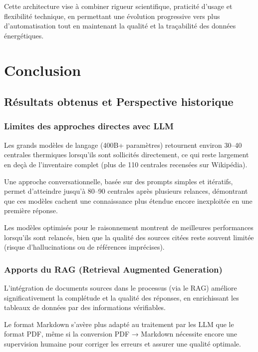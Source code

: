 \documentclass[a4paper,11pt]{report}
\begin{document}
Cette architecture vise à combiner rigueur scientifique, praticité d'usage et flexibilité technique, en permettant une évolution progressive vers plus d'automatisation tout en maintenant la qualité et la traçabilité des données énergétiques.

\chapter{Conclusion}\label{conclusion}

\section{Résultats obtenus et Perspective historique}\label{ruxe9sultats-obtenus-et-perspective-historique}

\subsection{Limites des approches directes avec LLM}\label{limites-des-approches-directes-avec-llm}

Les grands modèles de langage (400B+ paramètres) retournent environ 30--40 centrales thermiques lorsqu'ils sont sollicités directement, ce qui reste largement en deçà de l'inventaire complet (plus de 110 centrales recensées sur Wikipédia).

Une approche conversationnelle, basée sur des prompts simples et itératifs, permet d'atteindre jusqu'à 80--90 centrales après plusieurs relances, démontrant que ces modèles cachent une connaissance plus étendue encore inexploitée en une première réponse.

Les modèles optimisés pour le raisonnement montrent de meilleures performances lorsqu'ils sont relancés, bien que la qualité des sources citées reste souvent limitée (risque d'hallucinations ou de références imprécises).

\subsection{Apports du RAG (Retrieval Augmented Generation)}\label{apports-du-rag-retrieval-augmented-generation}

L'intégration de documents sources dans le processus (via le RAG) améliore significativement la complétude et la qualité des réponses, en enrichissant les tableaux de données par des informations vérifiables.

Le format Markdown s'avère plus adapté au traitement par les LLM que le format PDF, même si la conversion PDF → Markdown nécessite encore une supervision humaine pour corriger les erreurs et assurer une qualité optimale.
\end{document}
